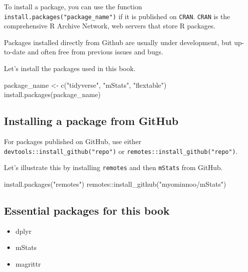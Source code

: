 \documentclass[
]{book}
\newenvironment{Shaded}{\begin{snugshade}}{\end{snugshade}}
\newcommand{\FunctionTok}[1]{\textcolor[rgb]{0.00,0.00,0.00}{#1}}
\newcommand{\NormalTok}[1]{#1}
\newcommand{\OtherTok}[1]{\textcolor[rgb]{0.56,0.35,0.01}{#1}}
\newcommand{\SpecialCharTok}[1]{\textcolor[rgb]{0.00,0.00,0.00}{#1}}
\newcommand{\StringTok}[1]{\textcolor[rgb]{0.31,0.60,0.02}{#1}}
\providecommand{\tightlist}{%
  \setlength{\itemsep}{0pt}\setlength{\parskip}{0pt}}
\begin{document}
To install a package, you can use the function \texttt{install.packages("package\_name")} if it is published on \texttt{CRAN}. \texttt{CRAN} is the comprehensive R Archive Network, web servers that store R packages.

Packages installed directly from Github are usually under development, but up-to-date and often free from previous issues and bugs.

Let's install the packages used in this book.

\begin{Shaded}
\begin{Highlighting}[]
\NormalTok{package\_name }\OtherTok{\textless{}{-}} \FunctionTok{c}\NormalTok{(}\StringTok{"tidyverse"}\NormalTok{, }\StringTok{"mStats"}\NormalTok{, }\StringTok{"flextable"}\NormalTok{)}
\FunctionTok{install.packages}\NormalTok{(package\_name)}
\end{Highlighting}
\end{Shaded}

\hypertarget{installing-a-package-from-github}{%
\subsection{Installing a package from GitHub}\label{installing-a-package-from-github}}

For packages published on GitHub, use either \texttt{devtools::install\_github("repo")} or \texttt{remotes::install\_github("repo")}.

Let's illustrate this by installing \texttt{remotes} and then \texttt{mStats} from GitHub.

\begin{Shaded}
\begin{Highlighting}[]
\FunctionTok{install.packages}\NormalTok{(}\StringTok{"remotes"}\NormalTok{)}
\NormalTok{remotes}\SpecialCharTok{::}\FunctionTok{install\_github}\NormalTok{(}\StringTok{"myominnoo/mStats"}\NormalTok{)}
\end{Highlighting}
\end{Shaded}

\hypertarget{essential-packages-for-this-book}{%
\subsection{Essential packages for this book}\label{essential-packages-for-this-book}}

\begin{itemize}
\tightlist
\item
  dplyr
\item
  mStats
\item
  magrittr
\end{itemize}
\end{document}
